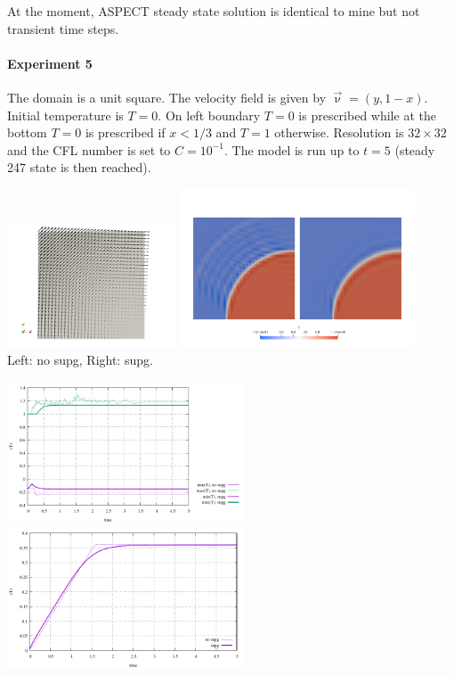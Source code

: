 At the moment, ASPECT steady state solution is identical to mine but not transient time steps.  

\paragraph{Experiment 5}

The domain is a unit square. The velocity field is given by $\vec\upnu=(y,1-x)$. Initial temperature is 
$T=0$. On left boundary $T=0$ is prescribed while at the bottom $T=0$ is prescribed if $x<1/3$ and $T=1$
otherwise. Resolution is $32\times32$ and the CFL number is set to $C=10^{-1}$. The model is run up to $t=5$ (steady
247 state is then reached).

\begin{center}
\includegraphics[width=5cm]{python_codes/fieldstone_43/results/experiment5/vel}
\includegraphics[width=7cm]{python_codes/fieldstone_43/results/experiment5/T}\\
{\captionfont Left: no supg, Right: supg.}
\end{center}


\begin{center}
\includegraphics[width=7cm]{python_codes/fieldstone_43/results/experiment5/stats_T}
\includegraphics[width=7cm]{python_codes/fieldstone_43/results/experiment5/avrg_T}
\end{center}





